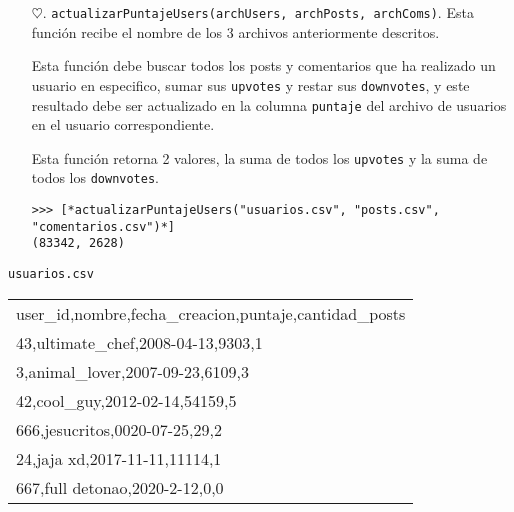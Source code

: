 \begin{enumerate}

    \item[$\heartsuit$.] \texttt{actualizarPuntajeUsers(archUsers, archPosts, archComs)}. Esta función recibe el nombre de los 3 archivos anteriormente descritos. 

    Esta función debe buscar todos los posts y comentarios que ha realizado un usuario en especifico, sumar sus \texttt{upvotes} y restar sus \texttt{downvotes}, y este resultado debe ser actualizado en la columna \texttt{puntaje} del archivo de usuarios en el usuario correspondiente.

    Esta función retorna 2 valores, la suma de todos los \texttt{upvotes} y la suma de todos los \texttt{downvotes}.

    \begin{lstlisting}[style=consola]
>>> [*actualizarPuntajeUsers("usuarios.csv", "posts.csv", "comentarios.csv")*]
(83342, 2628)
    \end{lstlisting}

\end{enumerate}

\begin{center}
    \texttt{usuarios.csv} \\
	\begin{tabular}{|l|}
		\hline
user\_id,nombre,fecha\_creacion,puntaje,cantidad\_posts\\
43,ultimate\_chef,2008-04-13,9303,1\\
3,animal\_lover,2007-09-23,6109,3\\
42,cool\_guy,2012-02-14,54159,5\\
666,jesucritos,0020-07-25,29,2\\
24,jaja xd,2017-11-11,11114,1\\
667,full detonao,2020-2-12,0,0\\
		\hline
	\end{tabular}
\end{center}
